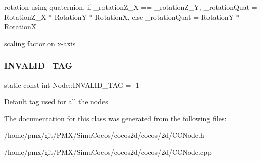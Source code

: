 rotation using quaternion, if \+\_\+rotation\+Z\+\_\+X == \+\_\+rotation\+Z\+\_\+Y, \+\_\+rotation\+Quat = Rotation\+Z\+\_\+X $\ast$ RotationY $\ast$ RotationX, else \+\_\+rotation\+Quat = RotationY $\ast$ RotationX 

scaling factor on x-\/axis \mbox{\label{classNode_aa8e6bb26098082b3d5bd5b6ba89e48c8}} 
\subsubsection{\texorpdfstring{I\+N\+V\+A\+L\+I\+D\+\_\+\+T\+AG}{INVALID\_TAG}}
{\footnotesize\ttfamily static const int Node\+::\+I\+N\+V\+A\+L\+I\+D\+\_\+\+T\+AG = -\/1\hspace{0.3cm}{\ttfamily [static]}}

Default tag used for all the nodes 

The documentation for this class was generated from the following files\+:\begin{DoxyCompactItemize}
\item 
/home/pmx/git/\+P\+M\+X/\+Simu\+Cocos/cocos2d/cocos/2d/C\+C\+Node.\+h\item 
/home/pmx/git/\+P\+M\+X/\+Simu\+Cocos/cocos2d/cocos/2d/C\+C\+Node.\+cpp\end{DoxyCompactItemize}
